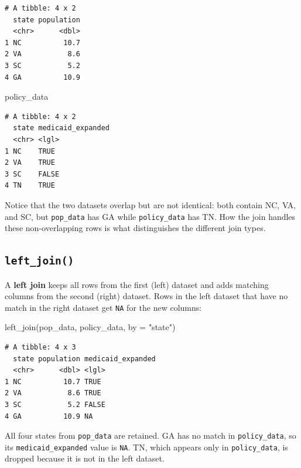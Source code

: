 \documentclass[
  letterpaper,
  DIV=11,
  numbers=noendperiod]{scrreprt}
\newenvironment{Shaded}{\begin{snugshade}}{\end{snugshade}}
\newcommand{\AttributeTok}[1]{\textcolor[rgb]{0.40,0.45,0.13}{#1}}
\newcommand{\FunctionTok}[1]{\textcolor[rgb]{0.28,0.35,0.67}{#1}}
\newcommand{\NormalTok}[1]{\textcolor[rgb]{0.00,0.23,0.31}{#1}}
\newcommand{\StringTok}[1]{\textcolor[rgb]{0.13,0.47,0.30}{#1}}
\begin{document}
\begin{verbatim}
# A tibble: 4 x 2
  state population
  <chr>      <dbl>
1 NC          10.7
2 VA           8.6
3 SC           5.2
4 GA          10.9
\end{verbatim}

\begin{Shaded}
\begin{Highlighting}[]
\NormalTok{policy\_data}
\end{Highlighting}
\end{Shaded}

\begin{verbatim}
# A tibble: 4 x 2
  state medicaid_expanded
  <chr> <lgl>            
1 NC    TRUE             
2 VA    TRUE             
3 SC    FALSE            
4 TN    TRUE             
\end{verbatim}

Notice that the two datasets overlap but are not identical: both contain
NC, VA, and SC, but \texttt{pop\_data} has GA while
\texttt{policy\_data} has TN. How the join handles these non-overlapping
rows is what distinguishes the different join types.

\subsection{\texorpdfstring{\texttt{left\_join()}}{left\_join()}}\label{left_join}

A \textbf{left join} keeps all rows from the first (left) dataset and
adds matching columns from the second (right) dataset. Rows in the left
dataset that have no match in the right dataset get \texttt{NA} for the
new columns:

\begin{Shaded}
\begin{Highlighting}[]
\FunctionTok{left\_join}\NormalTok{(pop\_data, policy\_data, }\AttributeTok{by =} \StringTok{"state"}\NormalTok{)}
\end{Highlighting}
\end{Shaded}

\begin{verbatim}
# A tibble: 4 x 3
  state population medicaid_expanded
  <chr>      <dbl> <lgl>            
1 NC          10.7 TRUE             
2 VA           8.6 TRUE             
3 SC           5.2 FALSE            
4 GA          10.9 NA               
\end{verbatim}

All four states from \texttt{pop\_data} are retained. GA has no match in
\texttt{policy\_data}, so its \texttt{medicaid\_expanded} value is
\texttt{NA}. TN, which appears only in \texttt{policy\_data}, is dropped
because it is not in the left dataset.
\end{document}
